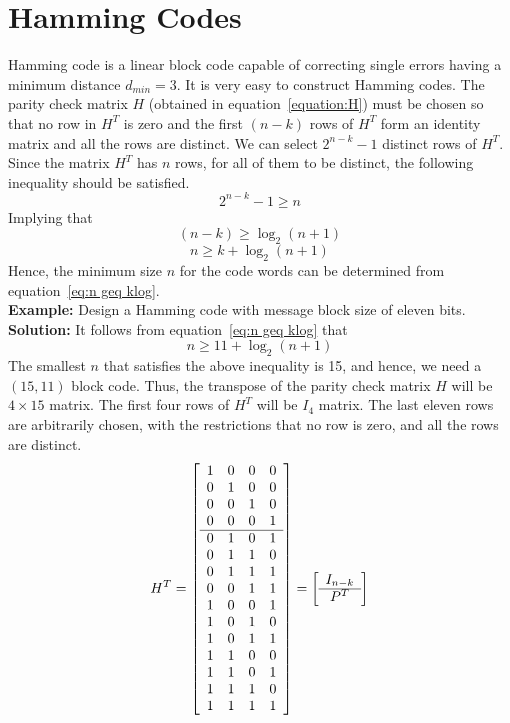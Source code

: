 \section{Hamming Codes}
Hamming code is a linear block code capable of correcting single errors having a minimum distance $d_{min} = 3$. It is very easy to construct Hamming codes. The parity check matrix $H$ (obtained in equation~\ref{equation:H}) must be chosen so that no row in $H^T$ is zero and the first $(n-k)$ rows of $H^T$ form an identity matrix and all the rows are distinct. We can select $2^{n-k}-1$ distinct rows of $H^T$.\\
Since the matrix $H^T$ has $n$ rows, for all of them to be distinct, the following inequality should be satisfied.
\[ 2^{n-k} -1 \geq n \]
Implying that
\[ (n-k) \geq \log_2(n+1) \]
\begin{equation}
    \label{eq:n geq klog}
    n \geq k + \log_2(n+1)
\end{equation}
Hence, the minimum size $n$ for the code words can be determined from equation~\ref{eq:n geq klog}. \\

\textbf{Example:} Design a Hamming code with message block size of eleven bits. \\
\textbf{Solution:} It follows from equation~\ref{eq:n geq klog} that
\[ n \geq 11 + \log_2(n+1) \]
The smallest $n$ that satisfies the above inequality is 15, and hence, we need a $(15,11)$ block code. Thus, the transpose of the parity check matrix $H$ will be $4 \times 15$ matrix. The first four rows of $H^T$ will be $I_4$ matrix. The last eleven rows are arbitrarily chosen, with the restrictions that no row is zero, and all the rows are distinct.
\begin{equation}
    \label{eq:H solution}
    H^T = \left[ \begin{array}{c c c c}
        1 & 0 & 0 & 0 \\
        0 & 1 & 0 & 0 \\
        0 & 0 & 1 & 0 \\
        0 & 0 & 0 & 1 \\
        \hline
        0 & 1 & 0 & 1 \\
        0 & 1 & 1 & 0 \\
        0 & 1 & 1 & 1 \\
        0 & 0 & 1 & 1 \\
        1 & 0 & 0 & 1 \\
        1 & 0 & 1 & 0 \\
        1 & 0 & 1 & 1 \\
        1 & 1 & 0 & 0 \\
        1 & 1 & 0 & 1 \\
        1 & 1 & 1 & 0 \\
        1 & 1 & 1 & 1
    \end{array} \right] = \left[ \begin{array}{c}
        I_{n-k} \\
        \hline
        P^T    
    \end{array} \right]
\end{equation}


